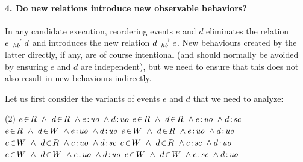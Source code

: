 
\paragraph{4. Do new relations introduce new observable behaviors?}
    In any candidate execution, reordering events $e$ and $d$ eliminates the relation $e\stackrel{\longrightarrow}{_{hb}}d$ and introduces the new relation $d\stackrel{\longrightarrow}{_{hb}}e$. 
    New behaviours created by the latter directly, if any, are 
    of course intentional (and should normally be avoided by ensuring $e$ and $d$ are independent), but we need to ensure that this does not also result in new behaviours indirectly. 
    
    Let us first consider the variants of events $e$ and $d$ that we need to analyze:
    \begin{tasks}(2)
        \task $\event{e}{R} \ \wedge \ \event{d}{R} \ \wedge \et{e}{uo} \ \wedge \et{d}{uo}$
        \task $\event{e}{R} \ \wedge \ \event{d}{R} \ \wedge \et{e}{uo} \ \wedge \et{d}{sc}$
        \task $\event{e}{R} \ \wedge \ \event{d}{W} \ \wedge \et{e}{uo} \ \wedge \et{d}{uo}$
        \task $\event{e}{W} \ \wedge \ \event{d}{R} \ \wedge \et{e}{uo} \ \wedge \et{d}{uo}$
        \task $\event{e}{W} \ \wedge \ \event{d}{R} \ \wedge \et{e}{uo} \ \wedge \et{d}{sc}$
        \task $\event{e}{W} \ \wedge \ \event{d}{R} \ \wedge \et{e}{sc} \ \wedge \et{d}{uo}$
        \task $\event{e}{W} \ \wedge \ \event{d}{W} \ \wedge \et{e}{uo} \ \wedge \et{d}{uo}$
        \task $\event{e}{W} \ \wedge \ \event{d}{W} \ \wedge \et{e}{sc} \ \wedge \et{d}{uo}$
    \end{tasks}

